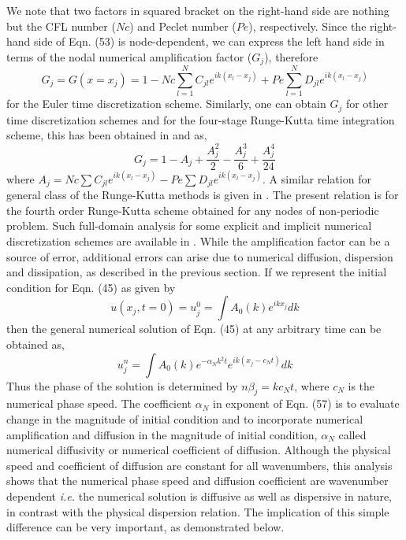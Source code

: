 \documentclass[showpacs,preprintnumbers,amsmath,amssymb]{revtex4-1} %
\begin{document}
We note that two factors in squared bracket on the right-hand side are nothing but the CFL number ($Nc$) and Peclet number ($Pe$), respectively. Since the right-hand side of Eqn. (53) is node-dependent, we can express the left hand side in terms of the nodal numerical amplification factor ($G_j$), therefore
\begin{equation}
G_j=G(x=x_j)=1-Nc \sum_{l=1}^N C_{jl}e^{ik(x_l-x_j)} + Pe \sum_{l=1}^N D_{jl}e^{ik(x_l-x_j)}
\end{equation}
for the Euler time discretization scheme. Similarly, one can obtain $G_j$ for other time discretization schemes and for the four-stage Runge-Kutta time integration scheme, this has been obtained in \cite{sengupta2013high} and \cite{SENGUPTA_et_al_2, SENGUPTA_et_al_7} as,
\begin{equation}
G_j=1-A_j+\frac{A_j^2}{2}-\frac{A_j^3}{6}+\frac{A_j^4}{24}
\end{equation}
where $A_j=Nc\sum C_{jl}e^{ik(x_l-x_j)}-Pe\sum D_{jl}e^{ik(x_l-x_j)}$. A similar relation for general class of the Runge-Kutta methods is given in \cite{BHAUMIK2013}. The present relation is for the fourth order Runge-Kutta scheme obtained for any nodes of non-periodic problem. Such full-domain analysis for some explicit and implicit numerical discretization schemes are available in \cite{sengupta2013high}. While the amplification factor can be a source of error, additional errors can arise due to numerical diffusion, dispersion and dissipation, as described in the previous section. If we represent the initial condition for Eqn. (45) as given by
\begin{equation}
u(x_j,t=0)=u_j^0=\int A_0(k)e^{ikx_j}dk
\end{equation}
then the general numerical solution of Eqn. (45) at any arbitrary time can be obtained as,
\begin{equation}
u_j^n=\int A_0(k)e^{-\alpha_Nk^2t}e^{ik(x_j-c_Nt)}dk
\end{equation}
Thus the phase of the solution is determined by $n\beta_j=kc_Nt$, where $c_N$ is the numerical phase speed. The coefficient $\alpha_N$ in exponent of Eqn. (57) is to evaluate change in the magnitude of initial condition and to incorporate numerical amplification and diffusion in the magnitude of initial condition, $\alpha_N$ called numerical diffusivity or numerical coefficient of diffusion. Although the physical speed and coefficient of diffusion are constant for all wavenumbers, this analysis shows that the numerical phase speed and diffusion coefficient are wavenumber dependent \textit{i.e.} the numerical solution is diffusive as well as dispersive in nature, in contrast with the physical dispersion relation. The implication of this simple difference can be very important, as demonstrated below.
\end{document}
